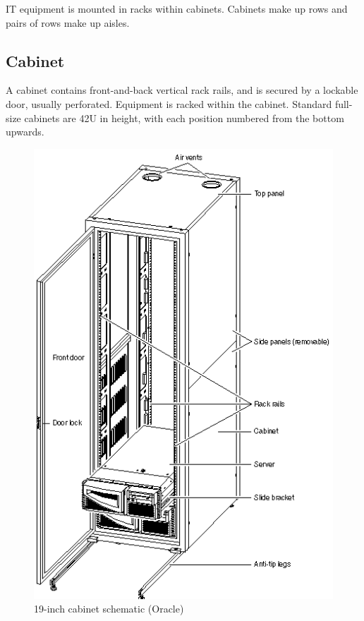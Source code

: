 \documentclass{pgnotes}
\begin{document}
IT equipment is mounted in racks within cabinets.
Cabinets make up rows and pairs of rows make up aisles.


\subsection{Cabinet}

A cabinet contains front-and-back vertical rack rails, and is secured by a lockable door, usually perforated.
Equipment is racked within the cabinet.
Standard full-size cabinets are 42U in height, with each position numbered from the bottom upwards.

\begin{figure}[htbp]
  \centering
  \includegraphics[width=1.0\linewidth,height=0.8\paperheight,keepaspectratio]{cabinet}
  \caption{19-inch cabinet schematic (Oracle)}
  \label{fig:cabinet}
\end{figure}
\end{document}
